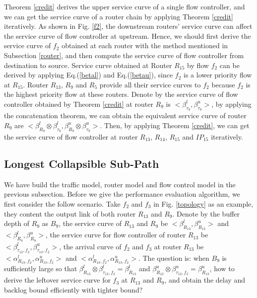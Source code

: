 \documentclass[10pt,journal]{IEEEtran}
\begin{document}
Theorem \ref{credit} derives the upper service curve of a single flow controller, and we can get the service curve of a router chain by applying Theorem
\ref{credit} iteratively. As shown in Fig. \ref{f2}, the downstream routers' service curve can affect the service curve of flow controller at upstream. Hence, we should first derive the service curve of $f_2$ obtained at each router with the method mentioned in Subsection \ref{router}, and then compute the service curve of flow controller from destination to source. Service curve obtained at Router $R_{15}$ by flow $f_2$ can be derived by applying Eq.(\ref{betal}) and Eq.(\ref{betau}), since $f_2$ is a lower priority flow at $R_{15}$. Router $R_{13}$, $R_{9}$ and $R_{5}$ provide all their service curves to $f_2$ because $f_2$ is the highest priority flow at these routers. Denote by the service curve of flow controller obtained by Theorem \ref{credit} at router $R_{9}$ is $<\beta_{\tau_9}^l,\beta_{\tau_9}^u>$, by applying the concatenation theorem, we can obtain the equivalent service curve of router $R_{9}$ are $<\beta_{R_9}^l\otimes\beta_{\tau_9}^l,\beta_{R_9}^u\otimes\beta_{\tau_9}^u>$. Then, by applying Theorem \ref{credit}, we can get the service curve of flow controller at router $R_{13}$, $R_{14}$, $R_{15}$ and $IP_{15}$ iteratively.

\subsection{Longest Collapsible Sub-Path}
We have build the traffic model, router model and flow control model in the previous subsection. Before we give the performance evaluation algorithm, we first consider the follow scenario. Take $f_2$ and $f_3$ in Fig. \ref{topology} as an example, they content the output link of both router $R_{13}$ and $R_{9}$. Denote by the buffer depth of $R_{9}$ as $B_{9}$, the service curve of $R_{13}$ and $R_{9}$ be $<\beta_{R_{13}}^l,\beta_{R_{13}}^u>$ and $<\beta_{R_{9}}^l,\beta_{R_{9}}^u>$, the service curve for flow controller of router $R_{13}$ be $<\beta_{\tau_{13},f_2}^l,\beta_{\tau_{13},f_2}^u>$, the arrival curve of $f_2$ and $f_3$ at router $R_{13}$ be $<\alpha_{R_{13},f_2}^l,\alpha_{R_{13},f_2}^u>$ and $<\alpha_{R_{13},f_2}^l,\alpha_{R_{13},f_2}^u>$. The question is: when $B_9$ is sufficiently large so that $\beta_{R_{13}}^l\otimes\beta_{\tau_{13},f_2}^l=\beta_{R_{13}}^l$ and $\beta_{R_{13}}^u\otimes\beta_{\tau_{13},f_2}^u=\beta_{R_{13}}^u$, how to derive the leftover service curve for $f_3$ at $R_{13}$ and $R_9$, and obtain the delay and backlog bound efficiently with tighter bound?
\end{document}
